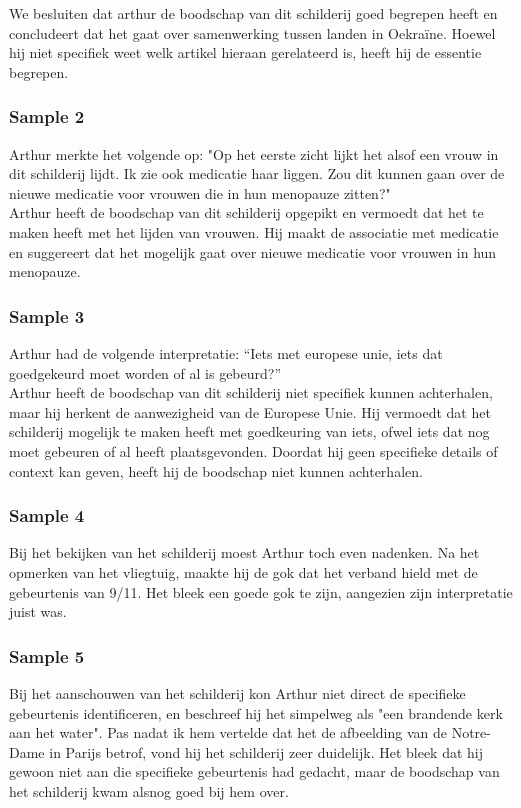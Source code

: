 We besluiten dat arthur de boodschap van dit schilderij goed begrepen heeft en concludeert dat het gaat over samenwerking tussen landen in Oekraïne. Hoewel hij niet specifiek weet welk artikel hieraan gerelateerd is, heeft hij de essentie begrepen. 

\subsubsection{Sample 2}
Arthur merkte het volgende op: "Op het eerste zicht lijkt het alsof een vrouw in dit schilderij lijdt. Ik zie ook medicatie haar liggen. Zou dit kunnen gaan over de nieuwe medicatie voor vrouwen die in hun menopauze zitten?" \\

Arthur heeft de boodschap van dit schilderij opgepikt en vermoedt dat het te maken heeft met het lijden van vrouwen. Hij maakt de associatie met medicatie en suggereert dat het mogelijk gaat over nieuwe medicatie voor vrouwen in hun menopauze. 

\subsubsection{Sample 3}
Arthur had de volgende interpretatie: ``Iets met europese unie, iets dat goedgekeurd moet worden of al is gebeurd?'' \\

Arthur heeft de boodschap van dit schilderij niet specifiek kunnen achterhalen, maar hij herkent de aanwezigheid van de Europese Unie. Hij vermoedt dat het schilderij mogelijk te maken heeft met goedkeuring van iets, ofwel iets dat nog moet gebeuren of al heeft plaatsgevonden. Doordat hij geen specifieke details of context kan geven, heeft hij de boodschap niet kunnen achterhalen. 

\subsubsection{Sample 4}
Bij het bekijken van het schilderij moest Arthur toch even nadenken. Na het opmerken van het vliegtuig, maakte hij de gok dat het verband hield met de gebeurtenis van 9/11. Het bleek een goede gok te zijn, aangezien zijn interpretatie juist was.

\subsubsection{Sample 5}
Bij het aanschouwen van het schilderij kon Arthur niet direct de specifieke gebeurtenis identificeren, en beschreef hij het simpelweg als "een brandende kerk aan het water". Pas nadat ik hem vertelde dat het de afbeelding van de Notre-Dame in Parijs betrof, vond hij het schilderij zeer duidelijk. Het bleek dat hij gewoon niet aan die specifieke gebeurtenis had gedacht, maar de boodschap van het schilderij kwam alsnog goed bij hem over.

